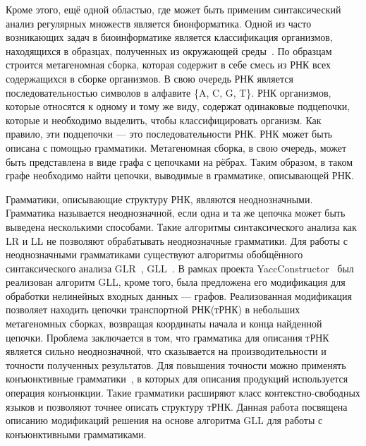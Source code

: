 \documentclass[14pt]{matmex-diploma}
\begin{document}
Кроме этого, ещё одной областью, где может быть применим синтаксический анализ регулярных множеств является бионформатика. Одной из часто возникающих задач в биоинформатике является классификация организмов, находящихся в образцах, полученных из окружающей среды~\cite{bioRNA}. По образцам строится метагеномная сборка, которая содержит в себе смесь из РНК всех содержащихся в сборке организмов. В свою очередь РНК является последовательностью символов в алфавите \{A, C, G, T\}. РНК организмов, которые относятся к одному и тому же виду, содержат одинаковые подцепочки, которые и необходимо выделить, чтобы классифицировать организм. Как правило, эти подцепочки --- это последовательности РНК. РНК может быть описана с помощью грамматики. Метагеномная сборка, в свою очередь, может быть представлена в виде графа с цепочками на рёбрах. Таким образом, в таком графе необходимо найти цепочки, выводимые в грамматике, описывающей РНК. 

Грамматики, описывающие структуру РНК, являются неоднозначными. Грамматика называется неоднозначной, если одна и та же цепочка может быть выведена несколькими способами. Такие алгоритмы синтаксического анализа как LR и LL не позволяют обрабатывать неоднозначные грамматики. Для работы с неоднозначными грамматиками существуют алгоритмы обобщённого синтаксического анализа GLR~\cite{GLR}, GLL~\cite{GLL}. В рамках проекта YaccConstructor~\cite{YaccConstructorPage, YaccConstructorPaper} был реализован алгоритм GLL, кроме того, была предложена его модификация для обработки нелинейных входных данных --- графов. Реализованная модификация позволяет находить цепочки транспортной РНК(тРНК) в небольших метагеномных сборках, возвращая координаты начала и конца найденной цепочки. Проблема заключается в том, что грамматика для описания тРНК является сильно неоднозначной, что сказывается на производительности и точности полученных результатов. Для повышения точности можно применять конъюнктивные грамматики~\cite{ConjGrammars}, в которых для описания продукций используется операция конъюнкции. Такие грамматики расширяют класс контекстно-свободных языков и позволяют точнее описать структуру тРНК. Данная работа посвящена описанию модификаций решения на основе алгоритма GLL для работы с конъюнктивными грамматиками.
\end{document}
